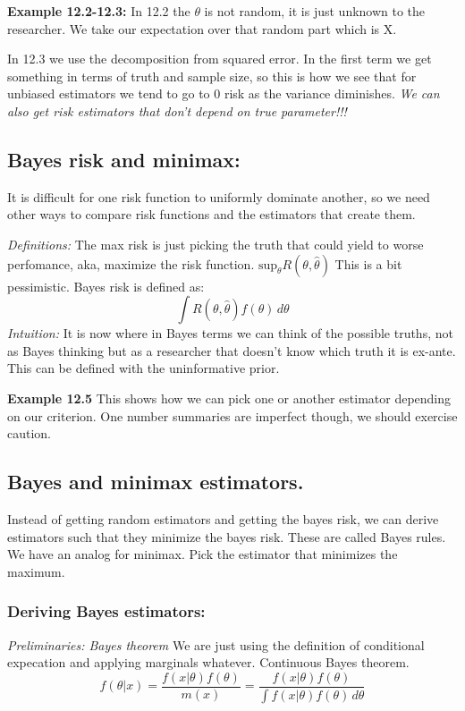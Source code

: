 \documentclass{article}
\begin{document}
\textbf{Example 12.2-12.3:}
In 12.2 the $\theta$ is not random, it is just unknown to the researcher. We take our expectation over that random part which is X.

In 12.3 we use the decomposition from squared error. In the first term we get something in terms of truth and sample size, so this is how we see that for unbiased
estimators we tend to go to 0 risk as the variance diminishes.
\textit{We can also get risk estimators that don't depend on true parameter!!!}

\subsection{Bayes risk and minimax:}
It is difficult for one risk function to uniformly dominate another, so we need other ways to compare risk functions and the estimators that create them.

\textit{Definitions:}
The max risk is just picking the truth that could yield to worse perfomance, aka, maximize the risk function. $\textrm{sup}_\theta R(\theta,\hat{\theta})$ This is a 
bit pessimistic.
Bayes risk is defined as: $$ \int R(\theta,\hat{\theta}) f(\theta)\,d\theta  $$
\textit{Intuition:} It is now where in Bayes terms we can think of the possible truths, not as Bayes thinking but as a researcher that 
doesn't know which truth it is ex-ante. This can be defined with the uninformative prior. 

\textbf{Example 12.5}
This shows how we can pick one or another estimator depending on our criterion. One number summaries are imperfect though,
we should exercise caution. 

\subsection{Bayes and minimax estimators.}
Instead of getting random estimators and getting the bayes risk, we can derive estimators such that they minimize
the bayes risk. These are called Bayes rules. We have an analog for minimax. Pick the estimator 
that minimizes the maximum.

\subsubsection{Deriving Bayes estimators:}
\textit{Preliminaries: Bayes theorem}
We are just using the definition of conditional expecation and applying marginals whatever. Continuous Bayes theorem.
$$f(\theta|x) = \frac{f(x|\theta)f(\theta)}{m(x)} = \frac{f(x|\theta)f(\theta)}{\int f(x|\theta)f(\theta) \, d\theta }$$ 
\end{document}
